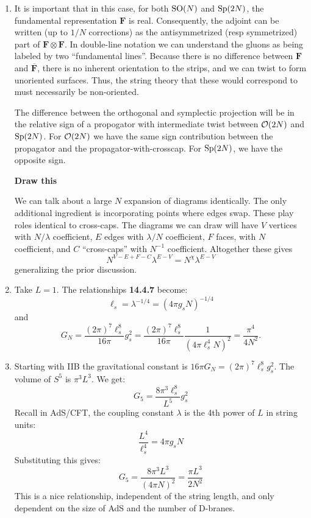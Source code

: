 \documentclass[11pt, class=article, crop=false]{standalone}
\begin{document}
\begin{enumerate}
	
	\item It is important that in this case, for both $\mathrm{SO}(N)$ and $\mathrm{Sp}(2N)$, the fundamental representation $\mathbf{F}$ is real. Consequently, the adjoint can be written (up to $1/N$ corrections) as the antisymmetrized (resp symmetrized) part of $\mathbf{F} \otimes \mathbf{F}$. In double-line notation we can understand the gluons as being labeled by two ``fundamental lines''. Because there is no difference between $\mathbf{F}$ and $\overline{\mathbf{F}}$, there is no inherent orientation to the strips, and we can twist to form unoriented surfaces. Thus, the string theory that these would correspond to must necessarily be non-oriented. 
	
	The difference between the orthogonal and symplectic projection will be in the relative sign of a propogator with intermediate twist between $\mathcal{O}(2N)$ and $\mathrm{Sp}(2N)$. For $\mathcal{O}(2N)$ we have the same sign contribution between the propagator and the propagator-with-crosscap. For $\mathrm{Sp}(2N)$, we have the opposite sign.
	
	\textbf{Draw this}
	
	We can talk about a large $N$ expansion of diagrams identically. The only additional ingredient is incorporating points where edges swap. These play roles identical to cross-caps. The diagrams we can draw will have $V$ vertices with $N/\lambda$ coefficient, $E$ edges with $\lambda/N$ coefficient, $F$ faces, with $N$ coefficient, and $C$ ``cross-caps'' with $N^{-1}$ coefficient. Altogether these gives 
	\[
		N^{V-E+F-C} \lambda^{E-V} = N^{\chi} \lambda^{E-V}
	\]
	generalizing the prior discussion.
	
	\item Take $L = 1$. The relationships \textbf{14.4.7} become:
	\[
		\ell_s = \lambda^{-1/4} = (4 \pi g_s N)^{-1/4}
	\]
	and
	\[
		G_N = \frac{(2 \pi)^7 \ell_s^8}{16 \pi} g_s^2 = \frac{(2 \pi)^7 \ell_s^8}{16 \pi} \frac{1}{(4 \pi \ell_s^4 N)^2} = \frac{\pi^4}{4 N^2}.
	\]
	
	\item 
	 Starting with IIB the gravitational constant is $16 \pi G_N = (2\pi)^7 \ell_s^8 g_s^2$. The volume of $S^5$ is $\pi^3 L^3$. We get:
	 \[
	 	G_5 = \frac{8 \pi^3 \ell_s^8}{L^5} g_s^2
	 \]
	 Recall in AdS/CFT, the coupling constant $\lambda$ is the 4th power of $L$ in string units: 
	 	\[
	 		\frac{L^4}{\ell_s^4} = 4 \pi g_s N
	 	\]
		Substituting this gives:
		\[
			G_5 = \frac{8 \pi^3 L^3}{(4 \pi N)^2} = \frac{\pi L^3}{2 N^2}
		\]
		This is a nice relationship, independent of the string length, and only dependent on the size of AdS and the number of D-branes. 
	

\end{enumerate}
\end{document}
